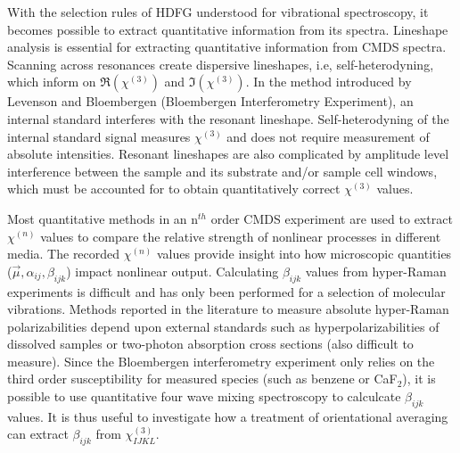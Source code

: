 \documentclass[aip, jcp, reprint, twocolumn]{revtex4-2}
\begin{document}
With the selection rules of HDFG understood for vibrational spectroscopy, it becomes possible to extract quantitative information from its spectra.
Lineshape analysis is essential for extracting quantitative information from CMDS spectra.
Scanning across resonances create dispersive lineshapes, i.e, self-heterodyning, which inform on $\Re(\chi^{(3)})$ and $\Im(\chi^{(3)})$.\cite{Levenson1974_1, Levenson1974_2}
In the method introduced by Levenson and Bloembergen (Bloembergen Interferometry Experiment), an internal standard interferes with the resonant lineshape.
Self-heterodyning of the internal standard signal measures $\chi^{(3)}$ and does not require measurement of absolute intensities. 
Resonant lineshapes are also complicated by amplitude level interference between the sample and its substrate and/or sample cell windows, which must be accounted for to obtain quantitatively correct $\chi^{(3)}$ values. \cite{RN362, RN418}

Most quantitative methods in an n$^{th}$ order CMDS experiment are used to extract $\chi^{(n)}$ values to compare the relative strength of nonlinear processes in different media. \cite{Zhu87, RN351, RN345}
The recorded $\chi^{(n)}$ values provide insight into how microscopic quantities ($\vec{\mu}, \alpha_{ij}, \beta_{ijk}$) impact nonlinear output.
Calculating $\beta_{ijk}$ values from hyper-Raman experiments is difficult and has only been performed for a selection of molecular vibrations. \cite{Xu1997, Shoute2005, Kelley2010}
Methods reported in the literature to measure absolute hyper-Raman polarizabilities depend upon external standards such as hyperpolarizabilities of dissolved samples or two-photon absorption cross sections (also difficult to measure).
Since the Bloembergen interferometry experiment only relies on the third order susceptibility for measured species (such as benzene or CaF$_2$), it is possible to use quantitative four wave mixing spectroscopy to calculcate $\beta_{ijk}$ values.
It is thus useful to investigate how a treatment of orientational averaging can extract $\beta_{ijk}$ from $\chi^{(3)}_{IJKL}$.
\end{document}
